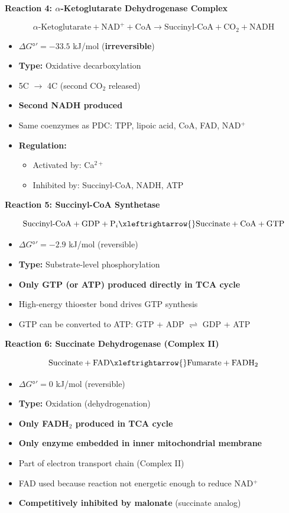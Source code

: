 \textbf{Reaction 4: $\alpha$-Ketoglutarate Dehydrogenase Complex}

\[
\alpha\text{-Ketoglutarate} + \text{NAD}^+ + \text{CoA} \rightarrow \text{Succinyl-CoA} + \text{CO}_2 + \text{NADH}
\]

\begin{itemize}
    \item $\Delta G°' = -33.5$ kJ/mol (\textbf{irreversible})
    \item \textbf{Type:} Oxidative decarboxylation
    \item 5C $\rightarrow$ 4C (second CO$_2$ released)
    \item \textbf{Second NADH produced}
    \item Same coenzymes as PDC: TPP, lipoic acid, CoA, FAD, NAD$^+$
    \item \textbf{Regulation:}
    \begin{itemize}
        \item Activated by: Ca$^{2+}$
        \item Inhibited by: Succinyl-CoA, NADH, ATP
    \end{itemize}
\end{itemize}

\textbf{Reaction 5: Succinyl-CoA Synthetase}

\[
\text{Succinyl-CoA} + \text{GDP} + \text{P}_i \xleftrightarrow{} \text{Succinate} + \text{CoA} + \text{GTP}
\]

\begin{itemize}
    \item $\Delta G°' = -2.9$ kJ/mol (reversible)
    \item \textbf{Type:} Substrate-level phosphorylation
    \item \textbf{Only GTP (or ATP) produced directly in TCA cycle}
    \item High-energy thioester bond drives GTP synthesis
    \item GTP can be converted to ATP: GTP + ADP $\rightleftharpoons$ GDP + ATP
\end{itemize}

\textbf{Reaction 6: Succinate Dehydrogenase (Complex II)}

\[
\text{Succinate} + \text{FAD} \xleftrightarrow{} \text{Fumarate} + \text{FADH}_2
\]

\begin{itemize}
    \item $\Delta G°' = 0$ kJ/mol (reversible)
    \item \textbf{Type:} Oxidation (dehydrogenation)
    \item \textbf{Only FADH$_2$ produced in TCA cycle}
    \item \textbf{Only enzyme embedded in inner mitochondrial membrane}
    \item Part of electron transport chain (Complex II)
    \item FAD used because reaction not energetic enough to reduce NAD$^+$
    \item \textbf{Competitively inhibited by malonate} (succinate analog)
\end{itemize}

